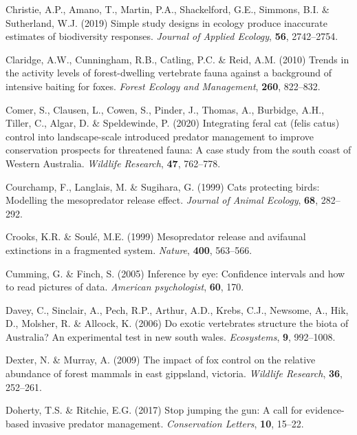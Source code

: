 \documentclass[]{elsarticle} %
\begin{document}
\leavevmode\hypertarget{ref-christie2019simple}{}%
Christie, A.P., Amano, T., Martin, P.A., Shackelford, G.E., Simmons, B.I. \& Sutherland, W.J. (2019) Simple study designs in ecology produce inaccurate estimates of biodiversity responses. \emph{Journal of Applied Ecology}, \textbf{56}, 2742--2754.

\leavevmode\hypertarget{ref-claridge2010trends}{}%
Claridge, A.W., Cunningham, R.B., Catling, P.C. \& Reid, A.M. (2010) Trends in the activity levels of forest-dwelling vertebrate fauna against a background of intensive baiting for foxes. \emph{Forest Ecology and Management}, \textbf{260}, 822--832.

\leavevmode\hypertarget{ref-comer2020integrating}{}%
Comer, S., Clausen, L., Cowen, S., Pinder, J., Thomas, A., Burbidge, A.H., Tiller, C., Algar, D. \& Speldewinde, P. (2020) Integrating feral cat (felis catus) control into landscape-scale introduced predator management to improve conservation prospects for threatened fauna: A case study from the south coast of Western Australia. \emph{Wildlife Research}, \textbf{47}, 762--778.

\leavevmode\hypertarget{ref-courchamp1999cats}{}%
Courchamp, F., Langlais, M. \& Sugihara, G. (1999) Cats protecting birds: Modelling the mesopredator release effect. \emph{Journal of Animal Ecology}, \textbf{68}, 282--292.

\leavevmode\hypertarget{ref-crooks1999mesopredator}{}%
Crooks, K.R. \& Soulé, M.E. (1999) Mesopredator release and avifaunal extinctions in a fragmented system. \emph{Nature}, \textbf{400}, 563--566.

\leavevmode\hypertarget{ref-cumming2005inference}{}%
Cumming, G. \& Finch, S. (2005) Inference by eye: Confidence intervals and how to read pictures of data. \emph{American psychologist}, \textbf{60}, 170.

\leavevmode\hypertarget{ref-davey2006exotic}{}%
Davey, C., Sinclair, A., Pech, R.P., Arthur, A.D., Krebs, C.J., Newsome, A., Hik, D., Molsher, R. \& Allcock, K. (2006) Do exotic vertebrates structure the biota of Australia? An experimental test in new south wales. \emph{Ecosystems}, \textbf{9}, 992--1008.

\leavevmode\hypertarget{ref-dexter2009impact}{}%
Dexter, N. \& Murray, A. (2009) The impact of fox control on the relative abundance of forest mammals in east gippsland, victoria. \emph{Wildlife Research}, \textbf{36}, 252--261.

\leavevmode\hypertarget{ref-doherty2017stop}{}%
Doherty, T.S. \& Ritchie, E.G. (2017) Stop jumping the gun: A call for evidence-based invasive predator management. \emph{Conservation Letters}, \textbf{10}, 15--22.
\end{document}
